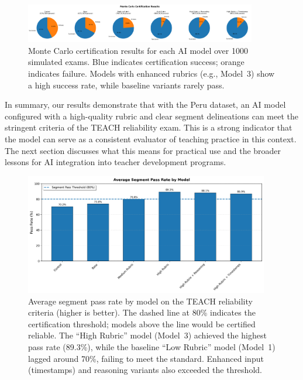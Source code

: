 \documentclass[12pt]{article}
\begin{document}
\begin{figure}[t]\centering
\includegraphics[width=0.9\textwidth]{monte_carlo_pie_charts.png}
\caption{Monte Carlo certification results for each AI model over 1000 simulated exams. Blue indicates certification success; orange indicates failure. Models with enhanced rubrics (e.g., Model~3) show a high success rate, while baseline variants rarely pass.}
\label{fig:monte-carlo-pie}
\end{figure}

In summary, our results demonstrate that with the Peru dataset, an AI model configured with a high-quality rubric and clear segment delineations can meet the stringent criteria of the TEACH reliability exam. This is a strong indicator that the model can serve as a consistent evaluator of teaching practice in this context. The next section discusses what this means for practical use and the broader lessons for AI integration into teacher development programs.

\begin{figure}[t]\centering
\includegraphics[width=0.95\textwidth]{segment_pass_dashboard.png}
\caption{Average segment pass rate by model on the TEACH reliability criteria (higher is better). The dashed line at 80\% indicates the certification threshold; models above the line would be certified reliable. The “High Rubric” model (Model~3) achieved the highest pass rate (89.3\%), while the baseline “Low Rubric” model (Model~1) lagged around 70\%, failing to meet the standard. Enhanced input (timestamps) and reasoning variants also exceeded the threshold.}
\label{fig:segment-pass-bar}
\end{figure}
\end{document}
